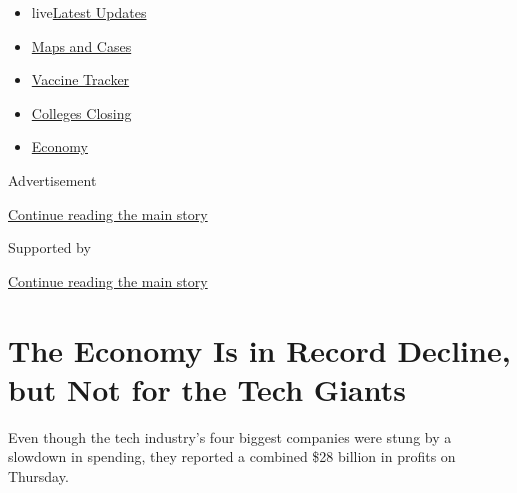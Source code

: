 \begin{itemize}
\tightlist
\item
  live\href{https://www.nytimes3xbfgragh.onion/2020/08/21/world/covid-19-coronavirus.html?name=styln-coronavirus-markets\&region=TOP_BANNER\&variant=undefined\&block=storyline_menu_recirc\&action=click\&pgtype=Article\&impression_id=b82c9990-e39e-11ea-bdf8-a17ccf54bfdb}{Latest
  Updates}
\item
  \href{https://www.nytimes3xbfgragh.onion/interactive/2020/us/coronavirus-us-cases.html?name=styln-coronavirus-markets\&region=TOP_BANNER\&variant=undefined\&block=storyline_menu_recirc\&action=click\&pgtype=Article\&impression_id=b82c9991-e39e-11ea-bdf8-a17ccf54bfdb}{Maps
  and Cases}
\item
  \href{https://www.nytimes3xbfgragh.onion/interactive/2020/science/coronavirus-vaccine-tracker.html?name=styln-coronavirus-markets\&region=TOP_BANNER\&variant=undefined\&block=storyline_menu_recirc\&action=click\&pgtype=Article\&impression_id=b82c9992-e39e-11ea-bdf8-a17ccf54bfdb}{Vaccine
  Tracker}
\item
  \href{https://www.nytimes3xbfgragh.onion/2020/08/19/us/colleges-closing-covid.html?name=styln-coronavirus-markets\&region=TOP_BANNER\&variant=undefined\&block=storyline_menu_recirc\&action=click\&pgtype=Article\&impression_id=b82c9993-e39e-11ea-bdf8-a17ccf54bfdb}{Colleges
  Closing}
\item
  \href{https://www.nytimes3xbfgragh.onion/live/2020/08/20/business/stock-market-today-coronavirus?name=styln-coronavirus-markets\&region=TOP_BANNER\&variant=undefined\&block=storyline_menu_recirc\&action=click\&pgtype=Article\&impression_id=b82c9994-e39e-11ea-bdf8-a17ccf54bfdb}{Economy}
\end{itemize}

Advertisement

\protect\hyperlink{after-top}{Continue reading the main story}

Supported by

\protect\hyperlink{after-sponsor}{Continue reading the main story}

\hypertarget{the-economy-is-in-record-decline-but-not-for-the-tech-giants}{%
\section{The Economy Is in Record Decline, but Not for the Tech
Giants}\label{the-economy-is-in-record-decline-but-not-for-the-tech-giants}}

Even though the tech industry's four biggest companies were stung by a
slowdown in spending, they reported a combined \$28 billion in profits
on Thursday.

